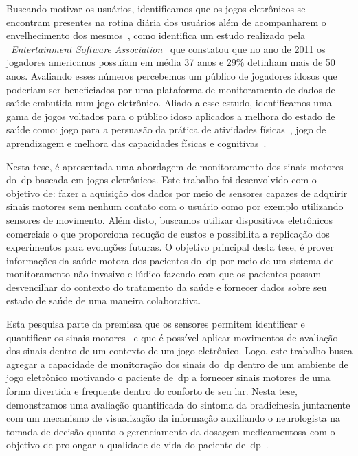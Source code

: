 Buscando motivar os usuários, identificamos que os jogos eletrônicos se encontram presentes na rotina diária dos usuários além de acompanharem o envelhecimento dos mesmos~\cite{moore2011basics}, como identifica um estudo realizado pela ~\textit{Entertainment Software Association}~\cite{esa2011} que constatou que no ano de 2011 os jogadores americanos possuíam em média 37 anos e 29$\%$ detinham mais de 50 anos. Avaliando esses números percebemos um público de jogadores idosos que poderiam ser beneficiados por uma plataforma de monitoramento de dados de saúde embutida num jogo eletrônico. Aliado a esse estudo, identificamos uma  gama de jogos voltados para o público idoso aplicados a melhora do estado de saúde como: jogo para a persuasão da prática de atividades físicas~\cite{brox11}, jogo de aprendizagem e melhora das capacidades físicas e cognitivas~\cite{arntzen2011}. 

Nesta tese, é apresentada uma abordagem de monitoramento dos sinais motores do~\ac{dp} baseada em jogos eletrônicos. Este trabalho foi desenvolvido com o objetivo de: fazer a aquisição dos dados por meio de sensores capazes de adquirir sinais motores sem nenhum contato com o usuário como por exemplo utilizando sensores de movimento. Além disto, buscamos utilizar dispositivos eletrônicos comerciais o que proporciona redução de custos e possibilita a replicação dos experimentos para evoluções futuras. O objetivo principal desta tese, é prover informações da saúde motora dos pacientes do~\ac{dp} por meio de um sistema de monitoramento não invasivo e lúdico fazendo com que os pacientes possam desvencilhar do contexto do tratamento da saúde e fornecer dados sobre seu estado de saúde de uma maneira colaborativa.

Esta pesquisa parte da premissa que os sensores permitem identificar e quantificar os sinais motores~\cite{patel_monitoring_2009,visionbased2009,bachlin_parkinsons_2009} e que é possível aplicar movimentos de avaliação dos sinais dentro de um contexto de um jogo eletrônico. Logo, este trabalho busca agregar a capacidade de monitoração dos sinais do~\ac{dp} dentro de um ambiente de jogo eletrônico motivando o paciente de~\ac{dp} a fornecer sinais motores de uma forma divertida e frequente dentro do conforto de seu lar. Nesta tese, demonstramos uma avaliação quantificada do sintoma da bradicinesia juntamente com um mecanismo de visualização da informação auxiliando o neurologista na tomada de decisão quanto o gerenciamento da dosagem medicamentosa com o objetivo de prolongar a qualidade de vida do paciente de~\ac{dp}~\cite{national2006parkinson}. 

